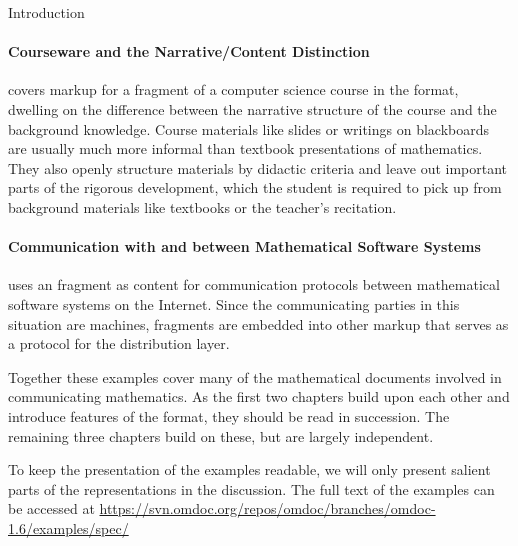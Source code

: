 \begin{omgroup}[id=intro]{Introduction}
\paragraph{ Courseware and the Narrative/Content Distinction}
covers markup for a fragment of a computer science course in the {\omdoc} format, dwelling
on the difference between the narrative structure of the course and the background
knowledge. Course materials like slides or writings on blackboards are usually much more
informal than textbook presentations of mathematics. They also openly structure materials
by didactic criteria and leave out important parts of the rigorous development, which the
student is required to pick up from background materials like textbooks or the teacher's
recitation.

\paragraph{ Communication with and between Mathematical Software Systems}
uses an {\omdoc} fragment as content for communication protocols between mathematical
software systems on the Internet.  Since the communicating parties in this situation are
machines, {\omdoc} fragments are embedded into other {\xml} markup that serves as a
protocol for the distribution layer.

\medskip 

Together these examples cover many of the mathematical documents involved in communicating
mathematics. As the first two chapters build upon each other and introduce features of the
{\omdoc} format, they should be read in succession.  The remaining three chapters build on
these, but are largely independent.

To keep the presentation of the examples readable, we will only present salient parts of
the {\omdoc} representations in the discussion. The full text of the examples can be
accessed at
\url{https://svn.omdoc.org/repos/omdoc/branches/omdoc-1.6/examples/spec/}
\end{omgroup}

